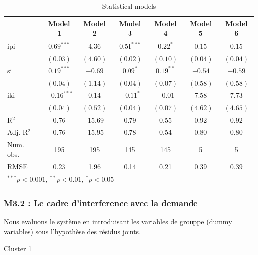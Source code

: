 \documentclass[11pt,]{article}
\begin{document}
\begin{table}[!htbp]
\begin{center}
\begin{tabular}{l c c c c c c }
\hline
 & Model 1 & Model 2 & Model 3 & Model 4 & Model 5 & Model 6 \\
\hline
ipi        & $0.69^{***}$  & $4.36$   & $0.51^{***}$ & $0.22^{*}$  & $0.15$   & $0.15$   \\
           & $(0.03)$      & $(4.60)$ & $(0.02)$     & $(0.10)$    & $(0.04)$ & $(0.04)$ \\
si         & $0.19^{***}$  & $-0.69$  & $0.09^{*}$   & $0.19^{**}$ & $-0.54$  & $-0.59$  \\
           & $(0.04)$      & $(1.14)$ & $(0.04)$     & $(0.07)$    & $(0.58)$ & $(0.58)$ \\
iki        & $-0.16^{***}$ & $0.14$   & $-0.11^{*}$  & $-0.01$     & $7.58$   & $7.73$   \\
           & $(0.04)$      & $(0.52)$ & $(0.04)$     & $(0.07)$    & $(4.62)$ & $(4.65)$ \\
\hline
R$^2$      & 0.76          & -15.69   & 0.79         & 0.55        & 0.92     & 0.92     \\
Adj. R$^2$ & 0.76          & -15.95   & 0.78         & 0.54        & 0.80     & 0.80     \\
Num. obs.  & 195           & 195      & 145          & 145         & 5        & 5        \\
RMSE       & 0.23          & 1.96     & 0.14         & 0.21        & 0.39     & 0.39     \\
\hline
\multicolumn{7}{l}{\scriptsize{$^{***}p<0.001$, $^{**}p<0.01$, $^*p<0.05$}}
\end{tabular}
\caption{Statistical models}
\label{table : ols et ivols clusters}
\end{center}
\end{table}

\FloatBarrier

\hypertarget{m3.2-le-cadre-dinterference-avec-la-demande}{%
\subsubsection{M3.2 : Le cadre d'interference avec la
demande}\label{m3.2-le-cadre-dinterference-avec-la-demande}}

Nous evaluons le système en introduisant les variables de grouppe (dummy
variables) sous l'hypothèse des résidus joints.

Cluster 1
\end{document}
